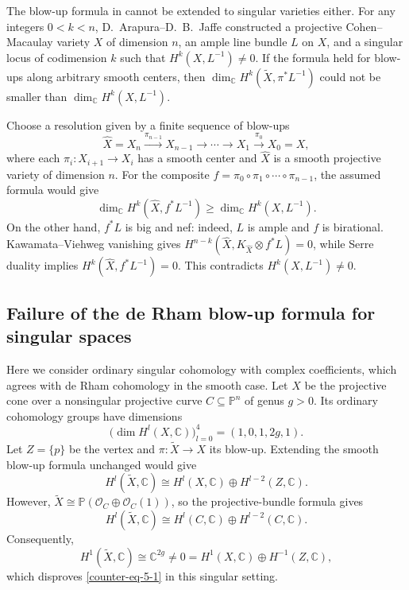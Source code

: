 \documentclass[11pt]{amsart}
\numberwithin{equation}{section}
\theoremstyle{plain}
\theoremstyle{definition}
\begin{document}
The blow-up formula in \cite[Theorem~1.2]{RYY20} cannot be extended to singular varieties
either.  For any integers $0<k<n$, D.~Arapura--D.~B.~Jaffe \cite{AJ} constructed a
projective Cohen--Macaulay variety $X$ of dimension $n$, an ample line bundle
$L$ on $X$, and a singular locus of codimension $k$ such that
$H^k(X,L^{-1})\neq0$.  If the formula held for blow-ups along arbitrary
smooth centers, then
$\dim_{\mathbb C}H^k(\tilde{X},\pi^*L^{-1})$ could not be smaller than
$\dim_{\mathbb C}H^k(X,L^{-1})$.

Choose a resolution given by a finite sequence of blow-ups
\[
\widehat X=X_n\xrightarrow{\pi_{n-1}}X_{n-1}\longrightarrow\cdots
\longrightarrow X_1\xrightarrow{\pi_0}X_0=X,
\]
where each $\pi_i:X_{i+1}\longrightarrow X_i$ has a smooth center and $\widehat X$
is a smooth projective variety of dimension $n$.  For the composite
$f=\pi_0\circ\pi_1\circ\cdots\circ\pi_{n-1}$, the assumed formula would give
\[
\dim_{\mathbb C}H^k(\widehat X,f^*L^{-1})
\geq\dim_{\mathbb C}H^k(X,L^{-1}).
\]
On the other hand, $f^*L$ is big and nef: indeed, $L$ is ample and $f$ is
birational.  Kawamata--Viehweg vanishing gives
$H^{n-k}(\widehat X,K_{\widehat X}\otimes f^*L)=0$, while Serre duality implies
$H^k(\widehat X,f^*L^{-1})=0$.  This contradicts $H^k(X,L^{-1})\neq0$.

\subsection{Failure of the de Rham blow-up formula for singular spaces}

Here we consider ordinary singular cohomology with complex coefficients,
which agrees with de Rham cohomology in the smooth case.  Let $X$ be the
projective cone over a nonsingular projective curve $C\subseteq\mathbb P^n$
of genus $g>0$.  Its ordinary cohomology groups have dimensions
\cite[Example~2.2.2]{ACM}
\[
\bigl(\dim H^l(X,\mathbb C)\bigr)_{l=0}^4=(1,0,1,2g,1).
\]
Let $Z=\{p\}$ be the vertex and $\pi:\tilde{X}\longrightarrow X$
its blow-up.  Extending the smooth blow-up formula unchanged would give
\begin{equation}\label{counter-eq-5-1}
H^l(\tilde{X},\mathbb C)
\cong H^l(X,\mathbb C)\oplus H^{l-2}(Z,\mathbb C).
\end{equation}
However, $\tilde{X}\cong\mathbb P(\mathcal O_C\oplus\mathcal O_C(1))$,
so the projective-bundle formula gives
\begin{equation}\label{counter-eq-5-2}
H^l(\tilde{X},\mathbb C)
\cong H^l(C,\mathbb C)\oplus H^{l-2}(C,\mathbb C).
\end{equation}
Consequently,
\[
H^1(\tilde{X},\mathbb C)\cong\mathbb C^{2g}\neq0
=H^1(X,\mathbb C)\oplus H^{-1}(Z,\mathbb C),
\]
which disproves \eqref{counter-eq-5-1} in this singular setting.
\end{document}
